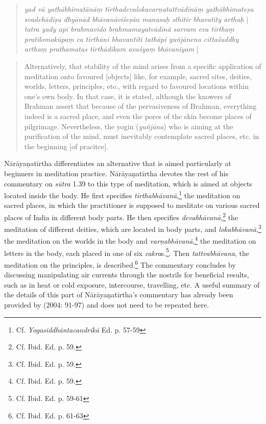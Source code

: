 \begin{quote}
\textit{yad vā yathābhimatānāṃ tīrthadevalokavarṇatattvādīnāṃ yathābhimateṣu svadehādiṣu dhyānād bhāvanāviśeṣān manasaḥ sthitir bhavatīty arthaḥ} | \textit{tatra yady api brahmavido brahmamayatvādinā sarvam eva tīrthaṃ pratilomakūpaṃ ca tīrthāni bhavantīti tathāpi yuñjānena cittaśuddhy arthaṃ prathamatas tīrthādikam avaśyaṃ bhāvanīyam} |
\end{quote}
\begin{quote}
 Alternatively, that stability of the mind arises from a specific application of meditation onto favoured [objects] like, for example, sacred sites, deities, worlds, letters, principles, etc., with regard to favoured locations within one's own body. In that case, it is stated, although the knowers of Brahman assert that because of the pervasiveness of Brahman, everything indeed is a sacred place, and even the pores of the skin become places of pilgrimage. Nevertheless, the yogin (\textit{yuñjāna}) who is aiming at the purification of the mind, must inevitably contemplate sacred places, etc. in the beginning [of pracitce].   
  \end{quote}

Nārāyaṇatīrtha differentiates an alternative that is aimed particularly at beginners in meditation practice. Nārāyaṇatīrtha devotes the rest of his commentary on \textit{sūtra} 1.39 to this type of meditation, which is aimed at objects located inside the body. He first specifies \textit{tīrthabhāvanā},\footnote{Cf. \emph{Yogasiddhāntacandrikā} Ed. p. 57-59} the meditation on sacred places, in which the practitioner is supposed to meditate on various sacred places of India in different body parts. He then specifies \textit{devabhāvanā},\footnote{Cf. Ibid. Ed. p. 59.} the meditation of different deities, which are located in body parts, and \textit{lokabhāvanā},\footnote{Cf. Ibid. Ed. p. 59.} the meditation on the worlds in the body and \textit{varṇabhāvanā},\footnote{Cf. Ibid. Ed. p. 59.} the meditation on letters in the body, each placed in one of six \textit{cakra}s.\footnote{Cf. Ibid. Ed. p. 59-61}. Then \textit{tattvabhāvana}, the meditation on the principles, is described.\footnote{Cf. Ibid. Ed. p. 61-63} The commentary concludes by discussing manipulating air currents through the nostrils for beneficial results, such as in heat or cold exposure, intercourse, travelling, etc. A useful summary of the details of this part of Nārāyaṇatīrtha's commentary has already been provided by \citeauthor{penna2004} (2004: 91-97) and does not need to be repeated here.

